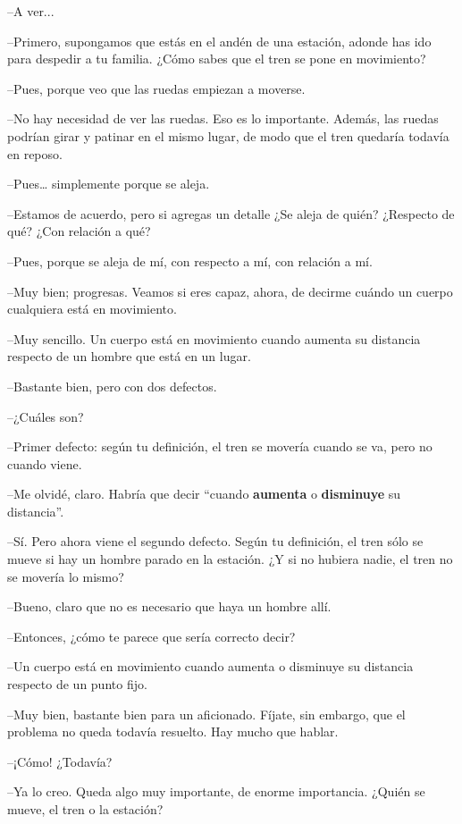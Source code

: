{{  --A ver...

  --Primero, supongamos que estás en el andén de una estación, adonde has ido para despedir a tu familia. ¿Cómo sabes que el tren se pone en movimiento?
   
  --Pues, porque veo que las ruedas empiezan a moverse.
   
  --No hay necesidad de ver las ruedas. Eso es lo importante. Además, las ruedas podrían girar y patinar en el mismo lugar, de modo que el tren quedaría todavía en reposo.
   
  --Pues… simplemente porque se aleja.
   
  --Estamos de acuerdo, pero si agregas un detalle ¿Se aleja de quién? ¿Respecto de qué? ¿Con relación a qué?
   
  --Pues, porque se aleja de mí, con respecto a mí, con relación a mí.
   
  --Muy bien; progresas. Veamos si eres capaz, ahora, de decirme cuándo un cuerpo cualquiera está en movimiento.
   
  --Muy sencillo. Un cuerpo está en movimiento cuando aumenta su distancia respecto de un hombre que está en un lugar.
   
  --Bastante bien, pero con dos defectos.
   
  --¿Cuáles son?
   
  --Primer defecto: según tu definición, el tren se movería cuando se va, pero no cuando viene.
   
  --Me olvidé, claro. Habría que decir ``cuando {\bf aumenta} o {\bf disminuye} su distancia''.
   
  --Sí. Pero ahora viene el segundo defecto. Según tu definición, el tren sólo se mueve si hay un hombre parado en la estación. ¿Y si no hubiera nadie, el tren no se movería lo mismo?
   
  --Bueno, claro que no es necesario que haya un hombre allí.
   
  --Entonces, ¿cómo te parece que sería correcto decir?
   
  --Un cuerpo está en movimiento cuando aumenta o disminuye su distancia respecto de un punto fijo.
   
  --Muy bien, bastante bien para un aficionado. Fíjate, sin embargo, que el problema no queda todavía resuelto. Hay mucho que hablar.
   
  --¡Cómo! ¿Todavía?
   
  --Ya lo creo. Queda algo muy importante, de enorme importancia. ¿Quién se mueve, el tren o la estación?
   
}}
